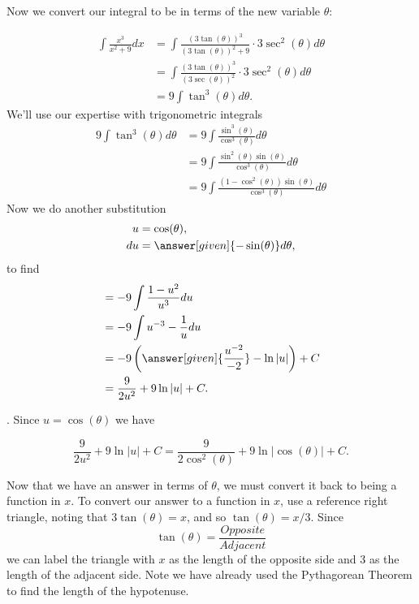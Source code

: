 \documentclass{ximera}
\begin{document}
\begin{example}
\begin{explanation}
Now we convert our integral to be in terms of the new variable $\theta$:

    \begin{align*}
      \int \frac{x^3}{x^2+9} dx &= \int \frac{(3\tan(\theta))^3}{(3\tan(\theta))^2+9} \cdot 3\sec^2(\theta) d\theta\\
      &=\int \frac{(3\tan(\theta))^3}{(3\sec(\theta))^2} \cdot 3\sec^2(\theta) d\theta\\
      &=9\int \tan^3(\theta)  d\theta.
    \end{align*}
    We'll use our expertise with trigonometric integrals
    \begin{align*}
      9\int \tan^3(\theta)  d\theta &= 9\int \frac{\sin^3(\theta)}{\cos^{3}(\theta)}  d\theta\\
      &= 9\int \frac{\sin^2(\theta) \sin(\theta)}{\cos^{3}(\theta)}  d\theta\\
      &= 9\int \frac{(1-\cos^2(\theta)) \sin(\theta)}{\cos^{3}(\theta)}   d\theta
    \end{align*}
    Now we do another substitution
    \begin{align*}
      u&=\cos(\theta),\\
      du &= \answer[given]{-\sin(\theta)}d\theta,
    \end{align*}
    to find
    \begin{align*}
      &= -9\int \frac{1-u^2}{u^3}du\\
      &= -9\int u^{-3}-\frac{1}{u}du\\
      &= -9\left(\answer[given]{\frac{u^{-2}}{-2}}-\ln|u|\right) + C\\
      &= \frac{9}{2u^2} + 9\ln|u| + C.
    \end{align*}

. Since $u = \cos(\theta)$ we have

    \[
    \frac{9}{2u^2} + 9\ln|u| + C = \frac{9}{2\cos^2(\theta)} + 9\ln|\cos(\theta)| + C.
    \]

    Now that we have an answer in terms of $\theta$, we must convert it back to
    being a function in $x$.
    To convert our answer to a function in $x$, use a reference right
    triangle, noting that $3\tan(\theta) = x$, and so $\tan(\theta) =
    x/3$. 
Since 
\[
\tan(\theta)=\frac{Opposite}{Adjacent}
\] 
we can label the triangle with $x$ as the length of the opposite side and $3$ as the length of the adjacent side. Note we have already used the Pythagorean Theorem to 
find the length of the hypotenuse. 

    








\end{explanation}
\end{example}
\end{document}
